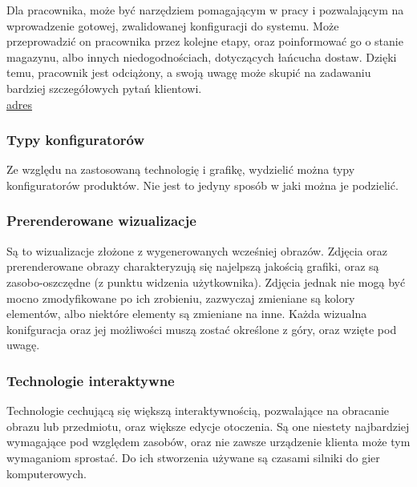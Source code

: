 \documentclass{article} %
\begin{document}
        Dla pracownika, może być narzędziem pomagającym w pracy i pozwalającym na wprowadzenie gotowej, zwalidowanej konfiguracji do systemu. Może przeprowadzić on pracownika przez kolejne etapy, oraz poinformować go o stanie magazynu, albo innych niedogodnościach, dotyczących łańcucha dostaw. Dzięki temu, pracownik jest odciążony, a swoją uwagę może skupić na zadawaniu bardziej szczegółowych pytań klientowi.
        \\
        \href{https://docs.oracle.com/cd/E16582_01/doc.91/e15086/und_configurator.htm#EOABC00002}{adres}
        \\
        
        \subsubsection{Typy konfiguratorów}
        Ze względu na zastosowaną technologię i grafikę, wydzielić można typy konfiguratorów produktów. Nie jest to jedyny sposób w jaki można je podzielić.
        \\
        
        \subsubsection*{Prerenderowane wizualizacje}
        Są to wizualizacje złożone z wygenerowanych wcześniej obrazów. Zdjęcia oraz prerenderowane obrazy charakteryzują się najelpszą jakością grafiki, oraz są zasobo-oszczędne (z punktu widzenia użytkownika). Zdjęcia jednak nie mogą być mocno zmodyfikowane po ich zrobieniu, zazwyczaj zmieniane są kolory elementów, albo niektóre elementy są zmieniane na inne. Każda wizualna konifguracja oraz jej możliwości muszą zostać określone z góry, oraz wzięte pod uwagę. 
        \\
        
        \subsubsection*{Technologie interaktywne}
        Technologie cechującą się większą interaktywnością, pozwalające na obracanie obrazu lub przedmiotu, oraz większe edycje otoczenia. Są one niestety najbardziej wymagające pod względem zasobów, oraz nie zawsze urządzenie klienta może tym wymaganiom sprostać. Do ich stworzenia używane są czasami silniki do gier komputerowych.
        \\
    
\end{document}
